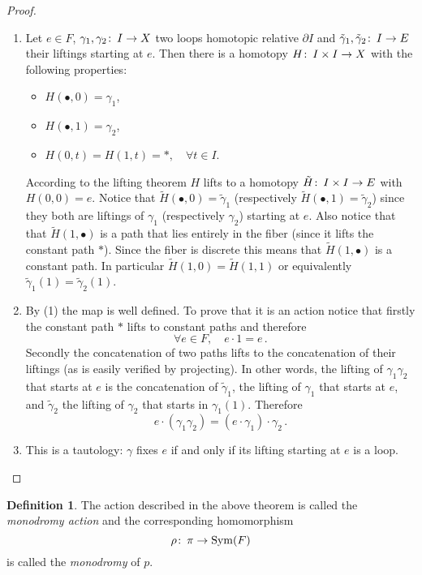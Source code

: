 \documentclass[12pt]{article}
\theoremstyle{definition}
\newtheorem{defn}[thm]{Definition}
\theoremstyle{remark}
\numberwithin{equation}{subsection}
\newcommand{\Gg}{\gamma}
\newcommand{\Gp}{\pi}
\newcommand{\Gr}{\rho}
\def\co{\colon\thinspace}
\begin{document}
\begin{proof}\begin{enumerate}
 \item Let $e\in F$,  $\Gg_1,\Gg_2\co I\to X$ two loops  homotopic relative
 $\partial I$ and  $\tilde\Gg_1,\tilde\Gg_2\co I\to E$ their liftings
 starting at $e$. Then there is a homotopy $H\co I\times I \to X$ with the
 following properties:
 \begin{itemize}
 \item $H(\bullet,0)=\Gg_1$,
 \item  $H(\bullet,1)=\Gg_2$,
 \item $H(0,t)=H(1,t)=*,\quad \forall t\in I$.
  \end{itemize}
 According to the lifting theorem $H$ lifts to a homotopy $\tilde H\co
 I\times I\to E$ with $H(0,0)=e$. Notice that  $\tilde
 H(\bullet,0)=\tilde\Gg_1$ (respectively $\tilde H(\bullet,1)=\tilde\Gg_2$)
 since they both are liftings of $\Gg_1$ (respectively $\Gg_2$) starting at
 $e$. Also notice that that $\tilde H(1,\bullet)$ is a path that lies entirely in
 the fiber (since it lifts the constant path $*$). Since the fiber is
 discrete this means that  $\tilde H(1,\bullet)$ is a constant path. In particular
 $\tilde H(1,0)=\tilde H(1,1)$ or equivalently $\tilde \Gg_1(1)=\tilde
 \Gg_2(1)$.
\item By (1) the map is well defined. To prove that it is an action notice
  that firstly the constant path $*$ lifts to constant paths and therefore
$$\forall e\in F,\quad e\cdot 1=e\,.$$
 Secondly the concatenation of two paths lifts to the concatenation of their
 liftings (as is easily verified by projecting). In other words, the lifting
 of $\Gg_1\Gg_2$ that starts at $e$ is the concatenation of $\tilde \Gg_1$, 
  the lifting of
 $\Gg_1$ that starts at $e$, and $\tilde \Gg_2$  the lifting of $\Gg_2$ that
 starts in $\Gg_1(1)$. Therefore 
  $$e\cdot (\Gg_1\Gg_2)=(e\cdot \Gg_1)\cdot \Gg_2\,.$$   
\item This is a tautology: $\Gg$ fixes $e$ if and only if its lifting
  starting at $e$ is a loop.  
\end{enumerate}
\end{proof}
 
\begin{defn}
The action described in the above theorem is called the \emph{monodromy
  action} and the corresponding homomorphism
 $$\Gr\co \Gp\to {\rm Sym}(F) $$
 is called the \emph{monodromy} of $p$. 
\end{defn}
\end{document}
